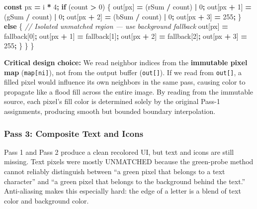 \documentclass[
  11pt,
  oneside]{report}
\newenvironment{Shaded}{\begin{snugshade}}{\end{snugshade}}
\newcommand{\CommentTok}[1]{\textcolor[rgb]{0.56,0.35,0.01}{\textit{#1}}}
\newcommand{\ControlFlowTok}[1]{\textcolor[rgb]{0.13,0.29,0.53}{\textbf{#1}}}
\newcommand{\DecValTok}[1]{\textcolor[rgb]{0.00,0.00,0.81}{#1}}
\newcommand{\KeywordTok}[1]{\textcolor[rgb]{0.13,0.29,0.53}{\textbf{#1}}}
\newcommand{\NormalTok}[1]{#1}
\newcommand{\OperatorTok}[1]{\textcolor[rgb]{0.81,0.36,0.00}{\textbf{#1}}}
\begin{document}
\begin{Shaded}
\begin{Highlighting}[]
    \KeywordTok{const}\NormalTok{ px }\OperatorTok{=}\NormalTok{ i }\OperatorTok{*} \DecValTok{4}\OperatorTok{;}
    \ControlFlowTok{if}\NormalTok{ (count }\OperatorTok{\textgreater{}} \DecValTok{0}\NormalTok{) \{}
\NormalTok{      out[px]     }\OperatorTok{=}\NormalTok{ (rSum }\OperatorTok{/}\NormalTok{ count) }\OperatorTok{|} \DecValTok{0}\OperatorTok{;}
\NormalTok{      out[px }\OperatorTok{+} \DecValTok{1}\NormalTok{] }\OperatorTok{=}\NormalTok{ (gSum }\OperatorTok{/}\NormalTok{ count) }\OperatorTok{|} \DecValTok{0}\OperatorTok{;}
\NormalTok{      out[px }\OperatorTok{+} \DecValTok{2}\NormalTok{] }\OperatorTok{=}\NormalTok{ (bSum }\OperatorTok{/}\NormalTok{ count) }\OperatorTok{|} \DecValTok{0}\OperatorTok{;}
\NormalTok{      out[px }\OperatorTok{+} \DecValTok{3}\NormalTok{] }\OperatorTok{=} \DecValTok{255}\OperatorTok{;}
\NormalTok{    \} }\ControlFlowTok{else}\NormalTok{ \{}
      \CommentTok{// Isolated unmatched region — use background fallback}
\NormalTok{      out[px]     }\OperatorTok{=}\NormalTok{ fallback[}\DecValTok{0}\NormalTok{]}\OperatorTok{;}
\NormalTok{      out[px }\OperatorTok{+} \DecValTok{1}\NormalTok{] }\OperatorTok{=}\NormalTok{ fallback[}\DecValTok{1}\NormalTok{]}\OperatorTok{;}
\NormalTok{      out[px }\OperatorTok{+} \DecValTok{2}\NormalTok{] }\OperatorTok{=}\NormalTok{ fallback[}\DecValTok{2}\NormalTok{]}\OperatorTok{;}
\NormalTok{      out[px }\OperatorTok{+} \DecValTok{3}\NormalTok{] }\OperatorTok{=} \DecValTok{255}\OperatorTok{;}
\NormalTok{    \}}
\NormalTok{  \}}
\NormalTok{\}}
\end{Highlighting}
\end{Shaded}

\textbf{Critical design choice:} We read neighbor indices from the
\textbf{immutable pixel map} (\texttt{map{[}ni{]}}), not from the output
buffer (\texttt{out{[}{]}}). If we read from \texttt{out{[}{]}}, a
filled pixel would influence its own neighbors in the same pass, causing
color to propagate like a flood fill across the entire image. By reading
from the immutable source, each pixel's fill color is determined solely
by the original Pass-1 assignments, producing smooth but bounded
boundary interpolation.

\subsubsection{Pass 3: Composite Text and
Icons}\label{pass-3-composite-text-and-icons}

Pass 1 and Pass 2 produce a clean recolored UI, but text and icons are
still missing. Text pixels were mostly UNMATCHED because the green-probe
method cannot reliably distinguish between ``a green pixel that belongs
to a text character'' and ``a green pixel that belongs to the background
behind the text.'' Anti-aliasing makes this especially hard: the edge of
a letter is a blend of text color and background color.
\end{document}
